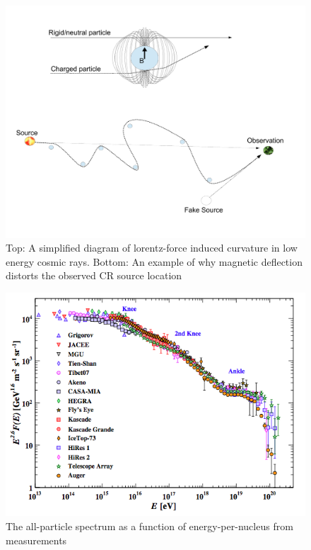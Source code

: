 \noindent		
\begin{figure}
	\includegraphics[width=\textwidth]{figures/CosmicRayDeflection}
	\caption{Top: A simplified diagram of lorentz-force induced curvature in low energy cosmic rays.  Bottom: An example of why magnetic deflection distorts the observed CR source location}
	\label{fig:CosmicRayDeviation}
\end{figure}
		

\noindent		
\begin{figure}
	\includegraphics[width=\textwidth]{figures/CosmicRayFluxMeasurements}
	\caption{The all-particle spectrum as a function of energy-per-nucleus from measurements\cite{Olive:2016xmw}}
	\label{fig:cosmicrayflux}
\end{figure}
		


